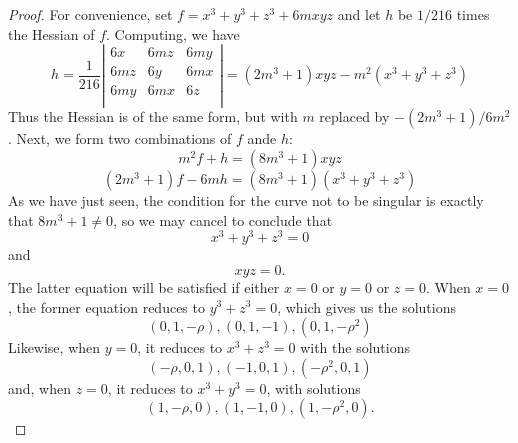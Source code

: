 \documentclass[12pt]{article}
\begin{document}
\begin{proof}
For convenience, set $f = x^3 + y^3 + z^3 + 6mxyz$ and
let $h$ be $1/216$ times the Hessian of $f$.
Computing, we have
\[
 h = \frac{1}{216}
 \left | \begin{matrix}
   6x & 6mz & 6my \\
   6mz & 6y & 6mx \\
   6my & 6mx & 6z \\
 \end{matrix} \right |
 = (2m^3 + 1) xyz - m^2 (x^3 + y^3 + z^3)
\]
Thus the Hessian is of the same form, but with $m$ replaced by
$-(2m^3 + 1) / 6m^2$.  Next, we form two combinations of $f$ 
ande $h$:
\[
 m^2 f + h = (8m^3 + 1) xyz
\]
\[
 (2m^3 + 1) f - 6mh = (8m^3 + 1) (x^3 + y^3 + z^3)
\]
As we have just seen, the condition for the curve not to be 
singular is exactly that $8m^3 + 1 \neq 0$, so we may cancel
to conclude that
\[
 x^3 + y^3 + z^3 = 0
\]
and
\[
 x y z = 0 .
\]
The latter equation will be satisfied if either $x = 0$ or 
$y = 0$ or $z = 0$.  When $x = 0$, the former equation reduces
to $y^3 + z^3 = 0$, which gives us the solutions
\[
 (0, 1, -\rho) , (0, 1, -1) , (0, 1, -\rho^2)
\]
Likewise, when $y = 0$, it reduces to $x^3 + z^3 = 0$ with
the solutions
\[
 (-\rho, 0, 1) , (-1, 0, 1) , (-\rho^2, 0, 1)
\]
and, when $z =0$, it reduces to $x^3 + y^3 = 0$, with
solutions
\[
  (1, -\rho, 0) , (1, -1, 0) , (1, -\rho^2, 0) .
\]
\end{proof}
\end{document}
